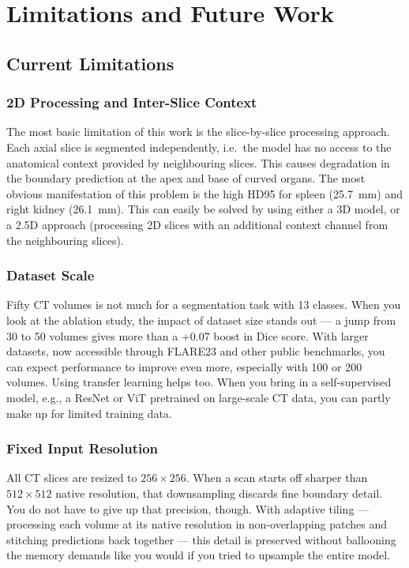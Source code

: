 \chapter{Limitations and Future Work}
\label{chap:future}

\section{Current Limitations}

\subsection{2D Processing and Inter-Slice Context}

The most basic limitation of this work is the slice-by-slice processing approach. Each axial slice is segmented independently, i.e.\ the model has no access to the anatomical context provided by neighbouring slices. This causes degradation in the boundary prediction at the apex and base of curved organs. The most obvious manifestation of this problem is the high HD95 for spleen (25.7~mm) and right kidney (26.1~mm). This can easily be solved by using either a 3D model, or a 2.5D approach (processing 2D slices with an additional context channel from the neighbouring slices).

\subsection{Dataset Scale}

Fifty CT volumes is not much for a segmentation task with 13 classes. When you look at the ablation study, the impact of dataset size stands out --- a jump from 30 to 50 volumes gives more than a $+$0.07 boost in Dice score. With larger datasets, now accessible through FLARE23 and other public benchmarks, you can expect performance to improve even more, especially with 100 or 200 volumes. Using transfer learning helps too. When you bring in a self-supervised model, e.g., a ResNet or ViT pretrained on large-scale CT data, you can partly make up for limited training data.

\subsection{Fixed Input Resolution}

All CT slices are resized to $256 \times 256$. When a scan starts off sharper than $512 \times 512$ native resolution, that downsampling discards fine boundary detail. You do not have to give up that precision, though. With adaptive tiling --- processing each volume at its native resolution in non-overlapping patches and stitching predictions back together --- this detail is preserved without ballooning the memory demands like you would if you tried to upsample the entire model.

